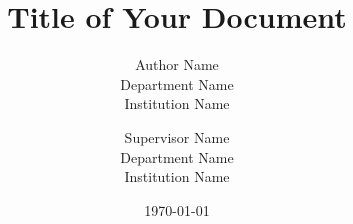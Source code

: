 \usepackage[utf8]{inputenc}
\usepackage[main=english,portuguese]{babel}
\usepackage{comment}
\usepackage{hyperref}
\hypersetup{
    colorlinks=true,
    linkcolor=black,
    filecolor=magenta,      
    urlcolor=cyan,
}
\usepackage{iflang}
\usepackage{amsmath,bm}
\usepackage{geometry} %
\usepackage{titling} %
\usepackage{setspace}
\usepackage{graphicx}
\usepackage{amsmath}
\usepackage{amsthm}
\usepackage{amsfonts}
\usepackage[caption=false]{subfig}
\usepackage[labelformat=simple]{caption}
\usepackage{dcolumn}
\usepackage{indentfirst}
\usepackage{verbatim}
\usepackage{cite}
\usepackage[printonlyused]{acronym}
\usepackage{lipsum}
\usepackage[]{cleveref}
\usepackage{color}



\geometry{a4paper, margin=2cm} %

\usepackage{times}

\title{\textbf{Title of Your Document}}
\author{Author Name \\ Department Name \\ Institution Name \and 
Supervisor Name \\ Department Name \\ Institution Name}
\date{\today}


\def\FontLn{%
  \usefont{T1}{phv}{m}{n}\fontsize{16pt}{16pt}\selectfont}
\def\FontLb{%
  \usefont{T1}{phv}{b}{n}\fontsize{16pt}{16pt}\selectfont}
\def\FontMn{%
  \usefont{T1}{phv}{m}{n}\fontsize{14pt}{14pt}\selectfont}
\def\FontMb{%
  \usefont{T1}{phv}{b}{n}\fontsize{14pt}{14pt}\selectfont}
\def\FontSn{%
  \usefont{T1}{phv}{m}{n}\fontsize{12pt}{12pt}\selectfont}
\def\FontIt{%
  \usefont{T1}{phv}{}{n}\fontsize{12pt}{12pt}\selectfont}

